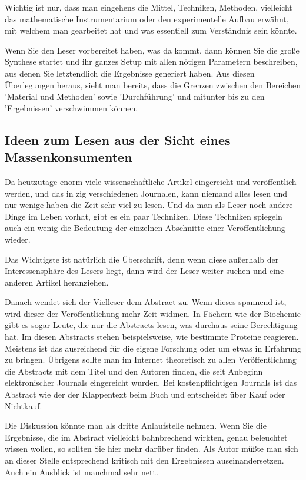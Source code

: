 \documentclass[10pt,twocolumn]{scrartcl}
\begin{document}
Wichtig ist nur, dass man eingehens die Mittel, Techniken,
Methoden, vielleicht das mathematische Instrumentarium 
oder den experimentelle Aufbau erwähnt, mit welchem man 
gearbeitet hat und was essentiell zum Verständnis sein könnte.

Wenn Sie den Leser vorbereitet haben, was da kommt, dann können
Sie die große Synthese startet und ihr ganzes Setup mit allen
nötigen Parametern beschreiben, aus denen Sie letztendlich
die Ergebnisse generiert haben. Aus diesen Überlegungen heraus, 
sieht man bereits, dass die Grenzen zwischen den Bereichen 
'Material und Methoden' sowie 'Durchführung' und mitunter 
bis zu den 'Ergebnissen' verschwimmen können.

\subsection*{Ideen zum Lesen aus der Sicht eines Massenkonsumenten}

Da heutzutage enorm viele wissenschaftliche Artikel
eingereicht und veröffentlich werden, und das in zig verschiedenen
Journalen, kann niemand alles lesen und nur wenige haben die Zeit 
sehr viel zu lesen. Und da man als Leser noch andere Dinge im Leben 
vorhat, gibt es ein paar Techniken.
Diese Techniken spiegeln auch ein wenig die Bedeutung der einzelnen 
Abschnitte einer Veröffentlichung wieder.

Das Wichtigste ist natürlich die Überschrift, denn wenn diese außerhalb
der Interessensphäre des Lesers liegt, dann wird der Leser weiter suchen
und eine anderen Artikel heranziehen.

Danach wendet sich der Vielleser dem Abstract zu. Wenn dieses spannend ist,
wird dieser der Veröffentlichung mehr Zeit widmen. In Fächern wie der
Biochemie gibt es sogar Leute, die nur die Abstracts lesen, was durchaus
seine Berechtigung hat. Im diesen Abstracts stehen beispielsweise, 
wie bestimmte Proteine reagieren. Meistens ist das ausreichend für 
die eigene Forschung oder um etwas in Erfahrung zu bringen.
Übrigens sollte man im Internet theoretisch zu allen Veröffentlichung
die Abstracts mit dem Titel und den Autoren finden, die seit Anbeginn 
elektronischer Journals eingereicht wurden. Bei kostenpflichtigen 
Journals ist das Abstract wie der der Klappentext beim Buch und
entscheidet über Kauf oder Nichtkauf.

Die Diskussion könnte man als dritte Anlaufstelle nehmen. Wenn Sie 
die Ergebnisse, die im Abstract vielleicht bahnbrechend wirkten, genau 
beleuchtet wissen wollen, so sollten Sie hier mehr darüber
finden. Als Autor müßte man sich an dieser Stelle entsprechend 
kritisch mit den Ergebnissen auseinandersetzen. Auch ein Ausblick
ist manchmal sehr nett.
\end{document}
